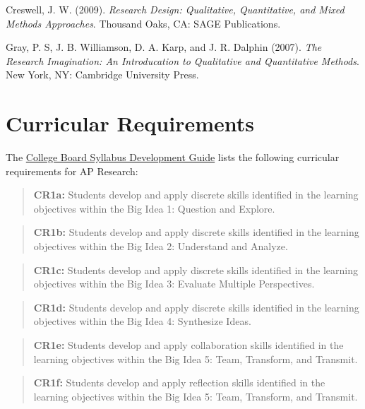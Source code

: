 \documentclass[]{article}
\begin{document}
Creswell, J. W. (2009). \emph{Research Design: Qualitative,
Quantitative, and Mixed Methods Approaches}. Thousand Oaks, CA:
SAGE Publications.

Gray, P. S, J. B. Williamson, D. A. Karp, and J. R. Dalphin
(2007). \emph{The Research Imagination: An Introducation to Qualitative
and Quantitative Methods}. New York, NY: Cambridge University
Press.

\hypertarget{curricular-requirements}{%
\section{Curricular Requirements}\label{curricular-requirements}}

The \href{https://secure-media.collegeboard.org/digitalServices/pdf/ap/ap-course-audit/ap-research-syllabus-development-guide.pdf}{College Board Syllabus Development Guide} lists the following curricular requirements for AP Research:

\begin{quote}
\textbf{CR1a:} Students develop and apply discrete skills identified in the learning objectives within the Big Idea 1: Question and Explore.
\end{quote}

\begin{quote}
\textbf{CR1b:} Students develop and apply discrete skills identified in the learning objectives within the Big Idea 2: Understand and Analyze.
\end{quote}

\begin{quote}
\textbf{CR1c:} Students develop and apply discrete skills identified in the learning objectives within the Big Idea 3: Evaluate Multiple Perspectives.
\end{quote}

\begin{quote}
\textbf{CR1d:} Students develop and apply discrete skills identified in the learning objectives within the Big Idea 4: Synthesize Ideas.
\end{quote}

\begin{quote}
\textbf{CR1e:} Students develop and apply collaboration skills identified in the learning objectives within the Big Idea 5: Team, Transform, and Transmit.
\end{quote}

\begin{quote}
\textbf{CR1f:} Students develop and apply reflection skills identified in the learning objectives within the Big Idea 5: Team, Transform, and Transmit.
\end{quote}
\end{document}
